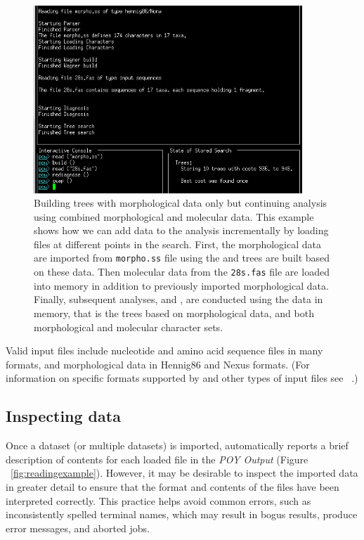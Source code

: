 {\begin{figure}[]
\begin{center}
\includegraphics[width=0.9\textwidth]{doc/figures/reading_example2.jpg}
\end{center}
\caption{Building trees with morphological data only but continuing analysis using combined morphological and 
molecular data. This example shows how we can add data to the analysis incrementally by loading files at different 
points in the search. First, the morphological data are imported from \texttt{morpho.ss} file using  
the and trees are built based on these data. Then molecular data from the \texttt{28s.fas} file are loaded into memory in 
addition to previously imported morphological data. Finally, subsequent analyses,  and 
, are conducted using the data in memory, that is the trees based on morphological data, and 
both morphological and molecular character sets.}
\label{fig:reading_example2}
\end{figure}

Valid input files include nucleotide and amino acid sequence files in many formats,
and morphological data in Hennig86 and Nexus formats. (For information on specific formats supported by \poy and 
other types of input files see ~.)

\subsection{Inspecting data}

Once a dataset (or multiple datasets) is imported, \poy automatically reports a brief description of contents for each loaded 
file in the \emph{POY Output} (Figure ~\ref{fig:readingexample}). However, it may be desirable to inspect the imported 
data in greater detail to ensure that the format and contents of the files have been interpreted correctly. This practice helps 
avoid common errors, such as inconsistently spelled terminal names, which may result in bogus results, produce error 
messages, and aborted jobs.

}
